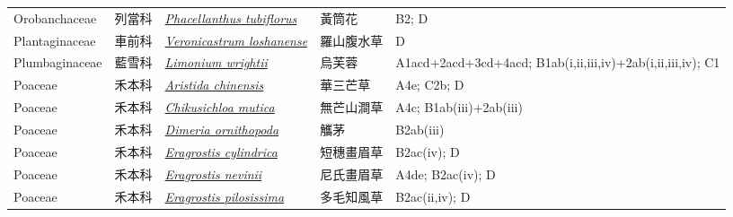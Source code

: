 {\begin{longtable}{L{2.5cm}L{2cm}L{5cm}L{2.5cm}L{3cm}}
    Orobanchaceae & 列當科 & \href{http://www.theplantlist.org/tpl1.1/search?q=Phacellanthus+tubiflorus}{\textit{Phacellanthus tubiflorus} } & 黃筒花 & B2; D    \\
    Plantaginaceae & 車前科 & \href{http://www.theplantlist.org/tpl1.1/search?q=Veronicastrum+loshanense}{\textit{Veronicastrum loshanense} } & 羅山腹水草 & D    \\
    Plumbaginaceae & 藍雪科 & \href{http://www.theplantlist.org/tpl1.1/search?q=Limonium+wrightii}{\textit{Limonium wrightii} } & 烏芙蓉 & A1acd+2acd+3cd+4acd; B1ab(i,ii,iii,iv)+2ab(i,ii,iii,iv); C1    \\
    Poaceae & 禾本科 & \href{http://www.theplantlist.org/tpl1.1/search?q=Aristida+chinensis}{\textit{Aristida chinensis} } & 華三芒草 & A4e; C2b; D    \\
    Poaceae & 禾本科 & \href{http://www.theplantlist.org/tpl1.1/search?q=Chikusichloa+mutica}{\textit{Chikusichloa mutica} } & 無芒山澗草 & A4c; B1ab(iii)+2ab(iii)    \\
    Poaceae & 禾本科 & \href{http://www.theplantlist.org/tpl1.1/search?q=Dimeria+ornithopoda}{\textit{Dimeria ornithopoda} } & 觿茅 & B2ab(iii)    \\
    Poaceae & 禾本科 & \href{http://www.theplantlist.org/tpl1.1/search?q=Eragrostis+cylindrica}{\textit{Eragrostis cylindrica} } & 短穗畫眉草 & B2ac(iv); D    \\
    Poaceae & 禾本科 & \href{http://www.theplantlist.org/tpl1.1/search?q=Eragrostis+nevinii}{\textit{Eragrostis nevinii} } & 尼氏畫眉草 & A4de; B2ac(iv); D    \\
    Poaceae & 禾本科 & \href{http://www.theplantlist.org/tpl1.1/search?q=Eragrostis+pilosissima}{\textit{Eragrostis pilosissima} } & 多毛知風草 & B2ac(ii,iv); D    \\

\end{longtable}}
